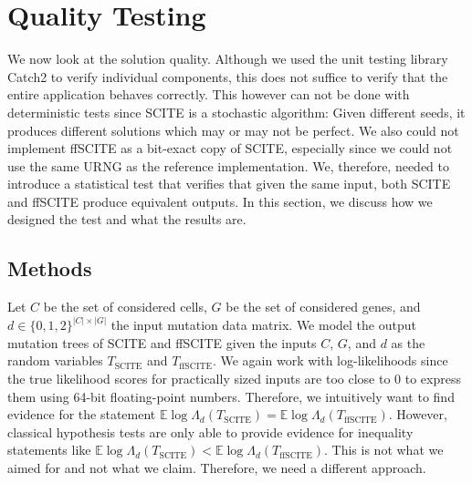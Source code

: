 \section{Quality Testing}

We now look at the solution quality. Although we used the unit testing library Catch2 to verify individual components, this does not suffice to verify that the entire application behaves correctly. This however can not be done with deterministic tests since \ac{SCITE} is a stochastic algorithm: Given different seeds, it produces different solutions which may or may not be perfect. We also could not implement \ac{ffSCITE} as a bit-exact copy of \ac{SCITE}, especially since we could not use the same \ac{URNG} as the reference implementation. We, therefore, needed to introduce a statistical test that verifies that given the same input, both \ac{SCITE} and \ac{ffSCITE} produce equivalent outputs. In this section, we discuss how we designed the test and what the results are.

\subsection{Methods}

Let $C$ be the set of considered cells, $G$ be the set of considered genes, and $d \in \{0,1,2\}^{|C| \times |G|}$ the input mutation data matrix. We model the output mutation trees of \ac{SCITE} and \ac{ffSCITE} given the inputs $C$, $G$, and $d$ as the random variables $T_\mathrm{SCITE}$ and $T_\mathrm{ffSCITE}$. We again work with log-likelihoods since the true likelihood scores for practically sized inputs are too close to 0 to express them using 64-bit floating-point numbers. Therefore, we intuitively want to find evidence for the statement $\mathbb{E} \log\Lambda_d(T_\mathrm{SCITE}) = \mathbb{E} \log\Lambda_d(T_\mathrm{ffSCITE})$. However, classical hypothesis tests are only able to provide evidence for inequality statements like $\mathbb{E} \log\Lambda_d(T_\mathrm{SCITE}) < \mathbb{E} \log\Lambda_d(T_\mathrm{ffSCITE})$. This is not what we aimed for and not what we claim. Therefore, we need a different approach.

